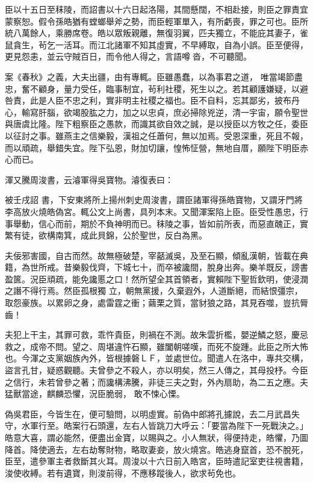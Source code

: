 \begin{pinyinscope}
 臣以十五日至秣陵，而詔書以十六日起洛陽，其間懸闊，不相赴接，則臣之罪責宜蒙察恕。假令孫皓猶有螳螂舉斧之勢，而臣輕軍單入，有所虧喪，罪之可也。臣所統八萬餘人，乘勝席卷。皓以眾叛親離，無復羽翼，匹夫獨立，不能庇其妻子，雀鼠貪生，茍乞一活耳。而江北諸軍不知其虛實，不早縛取，自為小誤。臣至便得，更見怨恚，並云守賊百日，而令他人得之，言語噂沓，不可聽聞。



 案《春秋》之義，大夫出疆，由有專輒。臣雖愚蠢，以為事君之道，
 唯當竭節盡忠，奮不顧身，量力受任，臨事制宜，茍利社稷，死生以之。若其顧護嫌疑，以避咎責，此是人臣不忠之利，實非明主社稷之福也。臣不自料，忘其鄙劣，披布丹心，輸寫肝腦，欲竭股肱之力，加之以忠貞，庶必掃除兇逆，清一宇宙，願令聖世與唐虞比隆。陛下粗察臣之愚款，而識其欲自效之誠，是以授臣以方牧之任，委臣以征討之事。雖燕主之信樂毅，漢祖之任蕭何，無以加焉。受恩深重，死且不報，而以頑疏，舉錯失宜。陛下弘恩，財加切讓，惶怖怔營，無地自厝，願陛下明臣赤心而已。



 渾又騰周浚書，云濬軍得吳寶物。濬復表曰：



 被壬戌詔
 書，下安東將所上揚州刺史周浚書，謂臣諸軍得孫皓寶物，又謂牙門將李高放火燒皓偽宮。輒公文上尚書，具列本末。又聞渾案陷上臣。臣受性愚忠，行事舉動，信心而前，期於不負神明而已。秣陵之事，皆如前所表，而惡直醜正，實繁有徒，欲構南箕，成此貝錦，公於聖世，反白為黑。



 夫佞邪害國，自古而然。故無極破楚，宰嚭滅吳，及至石顯，傾亂漢朝，皆載在典籍，為世所戒。昔樂毅伐齊，下城七十，而卒被讒間，脫身出奔。樂羊既反，謗書盈篋。況臣頑疏，能免讒慝之口！然所望全其首領者，實賴陛下聖哲欽明，使浸潤之譖不得行焉。然臣孤根獨
 立，朝無黨援，久棄遐外，人道斷絕，而結恨彊宗，取怨豪族。以累卵之身，處雷霆之衝；繭栗之質，當豺狼之路，其見吞噬，豈抗脣齒！



 夫犯上干主，其罪可救，乖忤貴臣，則禍在不測。故朱雲折檻，嬰逆鱗之怒，慶忌救之，成帝不問。望之、周堪違忤石顯，雖闔朝嗟嘆，而死不旋踵。此臣之所大怖也。今渾之支黨姻族內外，皆根據磐ＬＦ，並處世位。聞遣人在洛中，專共交構，盜言孔甘，疑惑觀聽。夫曾參之不殺人，亦以明矣，然三人傳之，其母投杼。今臣之信行，未若曾參之著；而讒構沸騰，非徒三夫之對，外內扇助，為二五之應。夫猛獸當途，麒麟恐懼，況臣脆弱，
 敢不悚心慄。



 偽吳君臣，今皆生在，便可驗問，以明虛實。前偽中郎將孔攄說，去二月武昌失守，水軍行至。皓案行石頭還，左右人皆跳刀大呼云：「要當為陛下一死戰決之。」皓意大喜，謂必能然，便盡出金寶，以賜與之。小人無狀，得便持走，皓懼，乃圖降首。降使適去，左右劫奪財物，略取妻妾，放火燒宮。皓逃身竄首，恐不脫死，臣至，遣參軍主者救斷其火耳。周浚以十六日前入皓宮，臣時遣記室吏往視書籍，浚使收縛。若有遺寶，則浚前得，不應移蹤後人，欲求茍免也。




\end{pinyinscope}
